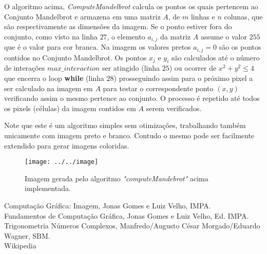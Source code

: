 \documentclass[12pt,a4paper]{article}
\begin{document}
	
	O algoritmo acima, \textit{ComputeMandelbrot} calcula os pontos os quais pertencem ao Conjunto Mandelbrot e armazena em uma matriz $A$, de $m$ linhas e $n$ colunas, que são respectivamente as dimensões da imagem. Se o ponto estiver fora do conjunto, como visto na linha $27$, o elemento $a_{i,j}$ da matriz $A$ assume o valor $255$ que é o valor para cor branca. Na imagem os valores pretos $a_{i,j} = 0$ são os pontos contidos no Conjunto Mandelbrot. Os pontos $x_j$ e $y_i$ são calculados até o número de interações $max\_interaction$ ser atingido (linha $25$) ou ocorrer de $x^2 + y^2 \leq 4$ que encerra o loop \textbf{while} (linha $28$) prosseguindo assim para o próximo pixel a ser calculado na imagem em $A$ para testar o correspondente ponto $(x,y)$ verificando assim o mesmo pertence ao conjunto. O processo é repetido até todos os pixels (células) da imagem contidos em $A$ serem verificados.
	
	Note que este é um algoritmo simples sem otimizações, trabalhando também unicamente com imagem preto e branco. Contudo o mesmo pode ser facilmente extendido para gerar imagens coloridas.\\
	
	\begin{figure}[h]
		\centering
		\texttt{[image: ../../image]}
		\caption{Imagem gerada pelo algoritmo \textit{"computeMandebrot"} acima implementada.}
		\label{fig:image}
	\end{figure}
	
\newpage

\begin{thebibliography}{9}
	 Computação Gráfica: Imagem, Jonas Gomes e Luiz Velho, IMPA.\\
	
	 Fundamentos de Computação Gráfica, Jonas Gomes e Luiz Velho, Ed. IMPA.\\
	
	  Trigonometria Números Complexos, Manfredo/Augusto César Morgado/Eduardo Wagner, SBM.\\
	
	 Wikipedia 
	
\end{thebibliography}
\end{document}
